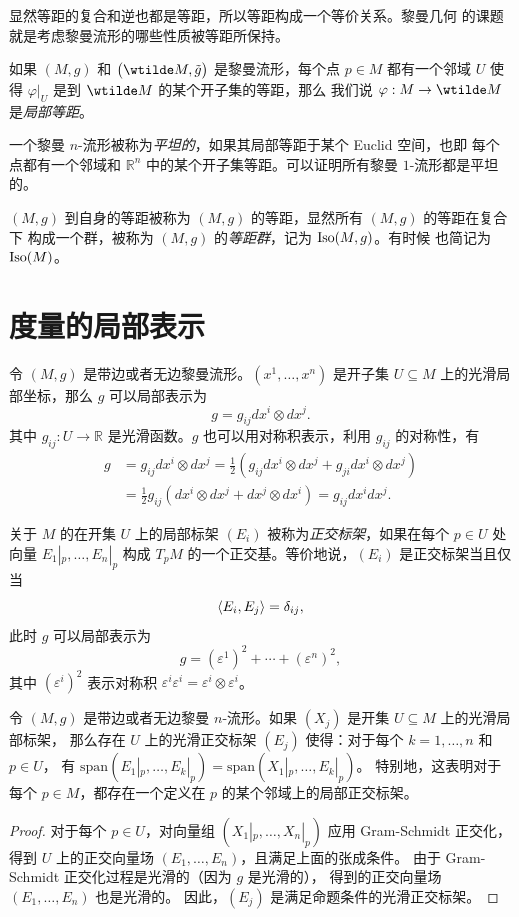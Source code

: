 显然等距的复合和逆也都是等距，所以等距构成一个等价关系。黎曼几何
的课题就是考虑黎曼流形的哪些性质被等距所保持。

如果 $(M,g)$ 和 $\bigl(\wtilde M,\tilde g\bigr)$ 是黎曼流形，每个点 $p\in M$
都有一个邻域 $U$ 使得 $\varphi|_U$ 是到 $\wtilde M$ 的某个开子集的等距，那么
我们说 $\varphi:M\to\wtilde M$ 是\emph{局部等距}。

一个黎曼 $n$-流形被称为\emph{平坦的}，如果其局部等距于某个 Euclid 空间，也即
每个点都有一个邻域和 $\mathbb{R}^n$ 中的某个开子集等距。可以证明所有黎曼
$1$-流形都是平坦的。

$(M,g)$ 到自身的等距被称为 $(M,g)$ 的等距，显然所有 $(M,g)$ 的等距在复合下
构成一个群，被称为 $(M,g)$ 的\emph{等距群}，记为 $\operatorname{Iso}(M,g)$。有时候
也简记为 $\operatorname{Iso}(M)$。

\section{度量的局部表示}

令 $(M,g)$ 是带边或者无边黎曼流形。$(x^1,\dots,x^n)$ 是开子集 $U\subseteq M$
上的光滑局部坐标，那么 $g$ 可以局部表示为
\[
  g=g_{ij}dx^i\otimes dx^j.
\]
其中 $g_{ij}:U\to \mathbb{R}$ 是光滑函数。$g$ 也可以用对称积表示，利用 $g_{ij}$
的对称性，有
\begin{align*}
  g&=g_{ij}dx^i\otimes dx^j =\frac{1}{2}(g_{ij}dx^i\otimes dx^j+g_{ji}dx^i\otimes dx^j)\\
  &=\frac{1}{2}g_{ij}(dx^i\otimes dx^j+dx^j\otimes dx^i)=g_{ij}dx^i dx^j.
\end{align*}

关于 $M$ 的在开集 $U$ 上的局部标架 $(E_i)$ 被称为\emph{正交标架}，如果在每个 $p\in U$
处向量 $E_1|_p,\dots,E_n|_p$ 构成 $T_pM$ 的一个正交基。等价地说，$(E_{i})$
是正交标架当且仅当
\[
  \left\langle E_i,E_j\right\rangle=\delta_{ij},
\]
此时 $g$ 可以局部表示为
\[
  g=(\varepsilon^1)^2+\cdots+(\varepsilon^n)^2,
\]
其中 $(\varepsilon^i)^2$ 表示对称积 $\varepsilon^i\varepsilon^i=\varepsilon^i\otimes\varepsilon^i$。

\begin{proposition}[正交标架的存在性]
  令 $(M,g)$ 是带边或者无边黎曼 $n$-流形。如果 $(X_j)$ 是开集 $U\subseteq M$ 上的光滑局部标架，
  那么存在 $U$ 上的光滑正交标架 $(E_j)$ 使得：对于每个 $k=1,\dots,n$ 和 $p\in U$，
  有 $\mathrm{span}(E_1|_p,\dots,E_k|_p)=\mathrm{span}(X_1|_p,\dots,E_k|_p)$。
  特别地，这表明对于每个 $p\in M$，都存在一个定义在 $p$ 的某个邻域上的局部正交标架。
\end{proposition}
\begin{proof}
  对于每个 $p\in U$，对向量组 $(X_1|_p,\dots,X_n|_p)$ 应用 Gram-Schmidt 正交化，
  得到 $U$ 上的正交向量场 $(E_1,\dots,E_n)$，且满足上面的张成条件。
  由于 Gram-Schmidt 正交化过程是光滑的（因为 $g$ 是光滑的），
  得到的正交向量场 $(E_1,\dots,E_n)$ 也是光滑的。
  因此，$(E_j)$ 是满足命题条件的光滑正交标架。
\end{proof}

